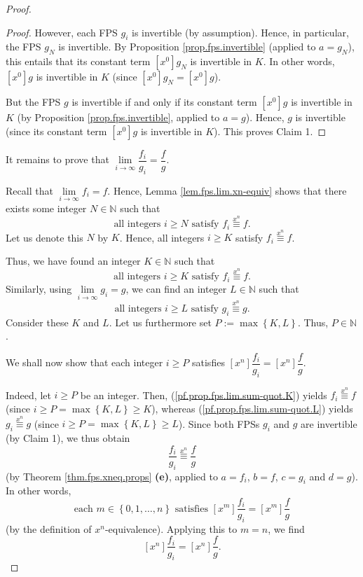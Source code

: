 \begin{fineprint}
\begin{proof}
\begin{proof}
However, each FPS $g_{i}$ is invertible (by assumption). Hence, in particular,
the FPS $g_{N}$ is invertible. By Proposition \ref{prop.fps.invertible}
(applied to $a=g_{N}$), this entails that its constant term $\left[
x^{0}\right]  g_{N}$ is invertible in $K$. In other words, $\left[
x^{0}\right]  g$ is invertible in $K$ (since $\left[  x^{0}\right]
g_{N}=\left[  x^{0}\right]  g$).

But the FPS $g$ is invertible if and only if its constant term $\left[
x^{0}\right]  g$ is invertible in $K$ (by Proposition
\ref{prop.fps.invertible}, applied to $a=g$). Hence, $g$ is invertible (since
its constant term $\left[  x^{0}\right]  g$ is invertible in $K$). This proves
Claim 1.
\end{proof}

It remains to prove that $\lim\limits_{i\rightarrow\infty}\dfrac{f_{i}}{g_{i}%
}=\dfrac{f}{g}$.

Recall that $\lim\limits_{i\rightarrow\infty}f_{i}=f$. Hence, Lemma
\ref{lem.fps.lim.xn-equiv} shows that there exists some integer $N\in
\mathbb{N}$ such that
\[
\text{all integers }i\geq N\text{ satisfy }f_{i}\overset{x^{n}}{\equiv}f.
\]
Let us denote this $N$ by $K$. Hence, all integers $i\geq K$ satisfy
$f_{i}\overset{x^{n}}{\equiv}f$.

Thus, we have found an integer $K\in\mathbb{N}$ such that%
\begin{equation}
\text{all integers }i\geq K\text{ satisfy }f_{i}\overset{x^{n}}{\equiv}f.
\label{pf.prop.fps.lim.sum-quot.K}%
\end{equation}
Similarly, using $\lim\limits_{i\rightarrow\infty}g_{i}=g$, we can find an
integer $L\in\mathbb{N}$ such that
\begin{equation}
\text{all integers }i\geq L\text{ satisfy }g_{i}\overset{x^{n}}{\equiv}g.
\label{pf.prop.fps.lim.sum-quot.L}%
\end{equation}
Consider these $K$ and $L$. Let us furthermore set $P:=\max\left\{
K,L\right\}  $. Thus, $P\in\mathbb{N}$.

We shall now show that each integer $i\geq P$ satisfies $\left[  x^{n}\right]
\dfrac{f_{i}}{g_{i}}=\left[  x^{n}\right]  \dfrac{f}{g}$.

Indeed, let $i\geq P$ be an integer. Then, (\ref{pf.prop.fps.lim.sum-quot.K})
yields $f_{i}\overset{x^{n}}{\equiv}f$ (since $i\geq P=\max\left\{
K,L\right\}  \geq K$), whereas (\ref{pf.prop.fps.lim.sum-quot.L}) yields
$g_{i}\overset{x^{n}}{\equiv}g$ (since $i\geq P=\max\left\{  K,L\right\}  \geq
L$). Since both FPSs $g_{i}$ and $g$ are invertible (by Claim 1), we thus
obtain
\[
\dfrac{f_{i}}{g_{i}}\overset{x^{n}}{\equiv}\dfrac{f}{g}%
\]
(by Theorem \ref{thm.fps.xneq.props} \textbf{(e)}, applied to $a=f_{i}$,
$b=f$, $c=g_{i}$ and $d=g$). In other words,
\[
\text{each }m\in\left\{  0,1,\ldots,n\right\}  \text{ satisfies }\left[
x^{m}\right]  \dfrac{f_{i}}{g_{i}}=\left[  x^{m}\right]  \dfrac{f}{g}%
\]
(by the definition of $x^{n}$-equivalence). Applying this to $m=n$, we find%
\[
\left[  x^{n}\right]  \dfrac{f_{i}}{g_{i}}=\left[  x^{n}\right]  \dfrac{f}%
{g}.
\]



\end{proof}
\end{fineprint}
